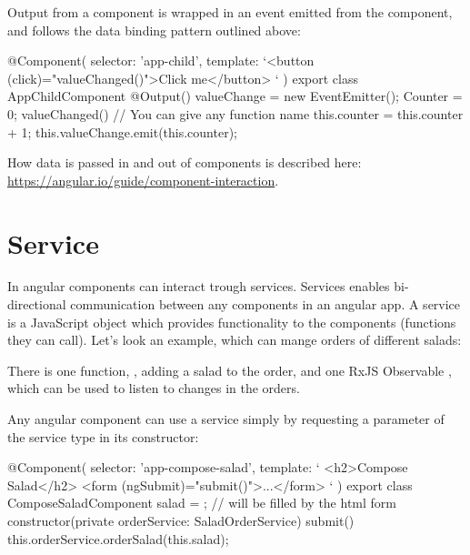 \begin{itemize}
Output from a component is wrapped in an event emitted from the component, and follows the data binding pattern outlined above:
\begin{Code}
@Component({
    selector: 'app-child',
    template: `<button (click)="valueChanged()">Click me</button> `
})
export class AppChildComponent {
    @Output() valueChange = new EventEmitter();
    Counter = 0;
    valueChanged() { // You can give any function name
        this.counter = this.counter + 1;
        this.valueChange.emit(this.counter);
    }
}
\end{Code}

How data is passed in and out of components is described here: \url{https://angular.io/guide/component-interaction}.

\section{Service}
In angular components can interact trough services. Services enables bi-directional communication between any components in an angular app. A service is a JavaScript object which provides functionality to the components (functions they can call). Let's look an example,  which can mange orders of different salads:
There is one function, , adding a salad to the order, and one RxJS Observable , which can be used to listen to changes in the orders.

Any angular component can use a service simply by requesting a parameter of the service type in its constructor:
\begin{Code}
@Component({
  selector: 'app-compose-salad',
  template: `
    <h2>Compose Salad</h2>
    <form (ngSubmit)="submit()">...</form>
  `
})
export class ComposeSaladComponent {
  salad = {};  // will be filled by the html form
  constructor(private orderService: SaladOrderService) {  }
  submit() {
    this.orderService.orderSalad(this.salad);
  }
}
\end{Code}


\end{itemize}
